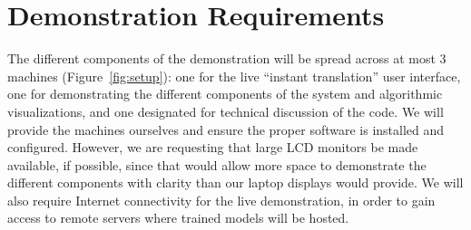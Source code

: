 \documentclass[11pt]{article}
\begin{document}

\section{Demonstration Requirements}

The different components of the demonstration will be spread across at most 3
machines (Figure~\ref{fig:setup}): one for the live ``instant translation'' user interface, one for
demonstrating the different components of the system and algorithmic
visualizations, and one designated for technical discussion of the code.  We
will provide the machines ourselves and ensure the proper software is installed
and configured.  However, we are requesting that large LCD monitors be made
available, if possible, since that would allow more space to demonstrate the
different components with clarity than our laptop displays would provide.  We
will also require Internet connectivity for the live demonstration, in order to
gain access to remote servers where trained models will be hosted.
\end{document}
